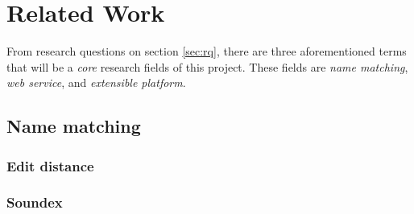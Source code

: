 \chapter{Related Work}
\label{ch:relatedwork}

From research questions on section \ref{sec:rq}, there are three aforementioned
terms that will be a \emph{core} research fields of this project.
These fields are \emph{name matching}, \emph{web service},
and \emph{extensible platform}.

\section{Name matching}

\subsection{Edit distance}


\subsection{Soundex}



